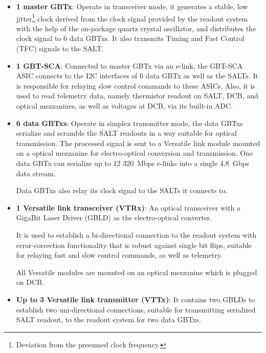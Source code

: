 \begin{itemize}
    \item \textbf{1 master GBTx}:
        Operate in transceiver mode,
        it generates a stable, low jitter\footnote{
            Deviation from the presumed clock frequency.
        } clock derived from the clock signal provided by the readout system
        with the help of the on-package quartz crystal oscillator,
        and distributes the clock signal to 6 data GBTxs.
        It also transmits Timing and Fast Control (TFC) signals to the SALT.

    \item \textbf{1 GBT-SCA}:
        Connected to master GBTx via an e-link,
        the GBT-SCA ASIC connects to the I2C interfaces
        of 6 data GBTx as well as the SALTs.
        It is responsible for relaying slow control commands to these ASICs.
        Also, it is used to read telemetry data,
        namely thermistor readout on SALT, DCB, and optical mezzanines,
        as well as voltages at DCB,
        via its built-in ADC.

    \item \textbf{6 data GBTxs}:
        Operate in simplex transmitter mode,
        the data GBTxs serialize and scramble the SALT readouts in a way
        suitable for optical transmission.
        The processed signal is sent to a Versatile link module mounted on
        a optical mezzanine for electro-optical conversion and transmission.
        One data GBTx can serialize up to 12 320~Mbps e-links into a single
        4.8~Gbps data stream.

        Data GBTxs also relay its clock signal to the SALTs it connects to.

    \item \textbf{1 Versatile link transceiver (VTRx)}:
        An optical transceiver with a GigaBit Laser Driver (GBLD)
        as the electro-optical converter.

        It is used to establish a bi-directional connection to the readout
        system with error-correction functionality that is robust against single
        bit flips,
        suitable for relaying fast and slow control commands, as well as
        telemetry.

        All Versatile modules are mounted on an optical mezzanine which is
        plugged on DCB.

    \item \textbf{Up to 3 Versatile link transmitter (VTTx)}:
        It contains two GBLDs to establish two uni-directional connections,
        suitable for transmitting serialized SALT readout,
        to the readout system for two data GBTxs.
\end{itemize}

